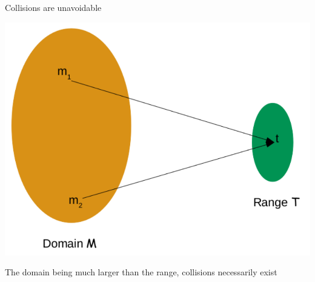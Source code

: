 \documentclass[aspectratio=169, lualatex, handout, 10pt,dvipsnames,svgnames]{beamer} %
\begin{document}
\begin{frame}{Collisions are unavoidable}

  \begin{center}
    \includegraphics[scale=0.5]{Images/Collisions.pdf}
  \end{center}

  The domain being much larger than the range, collisions necessarily exist
  
\end{frame}
\end{document}
